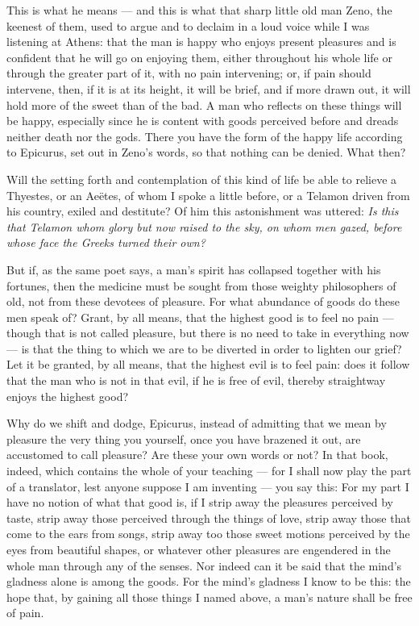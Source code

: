  This is what he means — and this is what that sharp little old man Zeno, the keenest of them, used to argue and to declaim in a loud voice while I was listening at Athens: that the man is happy who enjoys present pleasures and is confident that he will go on enjoying them, either throughout his whole life or through the greater part of it, with no pain intervening; or, if pain should intervene, then, if it is at its height, it will be brief, and if more drawn out, it will hold more of the sweet than of the bad. A man who reflects on these things will be happy, especially since he is content with goods perceived before and dreads neither death nor the gods. There you have the form of the happy life according to Epicurus, set out in Zeno's words, so that nothing can be denied. What then?

 Will the setting forth and contemplation of this kind of life be able to relieve a Thyestes, or an Aeëtes, of whom I spoke a little before, or a Telamon driven from his country, exiled and destitute? Of him this astonishment was uttered: \textit{Is this that Telamon whom glory but now raised to the sky, on whom men gazed, before whose face the Greeks turned their own?}

 But if, as the same poet says, a man's spirit has collapsed together with his fortunes, then the medicine must be sought from those weighty philosophers of old, not from these devotees of pleasure. For what abundance of goods do these men speak of? Grant, by all means, that the highest good is to feel no pain — though that is not called pleasure, but there is no need to take in everything now — is that the thing to which we are to be diverted in order to lighten our grief? Let it be granted, by all means, that the highest evil is to feel pain: does it follow that the man who is not in that evil, if he is free of evil, thereby straightway enjoys the highest good?

 Why do we shift and dodge, Epicurus, instead of admitting that we mean by pleasure the very thing you yourself, once you have brazened it out, are accustomed to call pleasure? Are these your own words or not? In that book, indeed, which contains the whole of your teaching — for I shall now play the part of a translator, lest anyone suppose I am inventing — you say this: For my part I have no notion of what that good is, if I strip away the pleasures perceived by taste, strip away those perceived through the things of love, strip away those that come to the ears from songs, strip away too those sweet motions perceived by the eyes from beautiful shapes, or whatever other pleasures are engendered in the whole man through any of the senses. Nor indeed can it be said that the mind's gladness alone is among the goods. For the mind's gladness I know to be this: the hope that, by gaining all those things I named above, a man's nature shall be free of pain.

